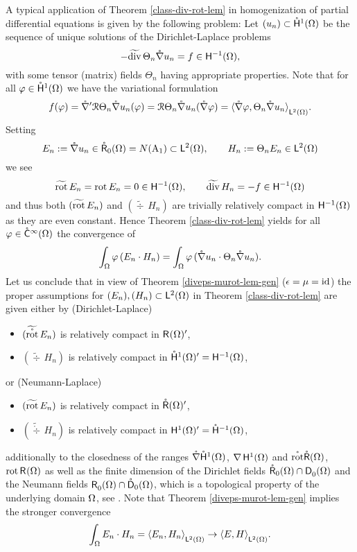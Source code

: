\documentclass[a4paper]{amsart}
\newcommand{\hmoc}{\mathring\hsymbol^{-1}}
\newcommand{\hmocom}{\hmoc(\om)}
\renewcommand{\dc}{\mathring\dsymbol}
\renewcommand{\R}{\mathcal{R}}
\DeclareMathOperator{\Ao}{A_{1}}
\newcommand{\grad}{\na}
\newcommand{\gradc}{\mathring\grad}
\renewcommand{\rotc}{\mathring\rot}
\renewcommand{\divc}{\mathring\div}
\begin{document}
A typical application of Theorem \ref{class-div-rot-lem} 
in homogenization of partial differential equations is given by the following problem:
Let $(u_{n})\subset\mathring{\mathsf{H}}^{1}(\Omega)$ be the sequence of unique solutions of the Dirichlet-Laplace problems
$$-\widetilde{\div}\,\Theta_{n}\gradc u_{n}=f\in\hmoom,$$
with some tensor (matrix) fields $\Theta_{n}$ having appropriate properties.
Note that for all $\varphi\in\mathring{\mathsf{H}}^{1}(\Omega)$ we have the variational formulation
$$f(\varphi)
=\gradc{}'\R\Theta_{n}\gradc u_{n}(\varphi)
=\R\Theta_{n}\gradc u_{n}(\gradc\varphi)
=\scpltom{\gradc\varphi}{\Theta_{n}\gradc u_{n}}.$$
Setting
$$E_{n}:=\gradc u_{n}\in\rczom=N(\Ao)\subset\ltom,\qquad
H_{n}:=\Theta_{n}E_{n}\in\ltom$$
we see
$$\widetilde{\operatorname{rot}}\,E_{n}=\operatorname{rot} E_{n}=0\in\overset{}{\mathsf{H}}{}^{-1}_{}(\Omega),\qquad
\widetilde{\operatorname{div}}\,H_{n}=-f\in\overset{}{\mathsf{H}}{}^{-1}_{}(\Omega)$$
and thus both $(\widetilde{\operatorname{rot}}\,E_{n})$ and $(\widetilde{\div}\,H_{n})$ 
are trivially relatively compact in $\overset{}{\mathsf{H}}{}^{-1}_{}(\Omega)$ as they are even constant.
Hence Theorem \ref{class-div-rot-lem} yields for all $\varphi\in\mathring{\mathsf{C}}^{\infty}(\Omega)$ the convergence of
$$\int_{\om}\varphi\,(E_{n}\cdot H_{n})
=\int_{\om}\varphi\,(\gradc u_{n}\cdot\Theta_{n}\gradc u_{n}).$$
Let us conclude that in view of Theorem \ref{diveps-murot-lem-gen} ($\epsilon=\mu=\operatorname{id}$)
the proper assumptions for $(E_{n}),(H_{n})\subset\overset{}{\mathsf{L}}{}^{2}_{}(\Omega)$ in Theorem \ref{class-div-rot-lem}
are given either by (Dirichlet-Laplace)
\begin{itemize}
\item
$(\widetilde{\rotc}\,E_{n})$ 
is relatively compact in $\overset{}{\mathsf{R}}{}^{}_{}(\Omega)'$,
\item
$(\widetilde{\div}\,H_{n})$ 
is relatively compact in $\mathring{\mathsf{H}}^{1}(\Omega)'=\overset{}{\mathsf{H}}{}^{-1}_{}(\Omega)$,
\end{itemize}
or (Neumann-Laplace)
\begin{itemize}
\item
$(\widetilde{\operatorname{rot}}\,E_{n})$ 
is relatively compact in $\mathring{\mathsf{R}}(\Omega)'$,
\item
$(\widetilde{\divc}\,H_{n})$ 
is relatively compact in $\hoom'=\hmocom$,
\end{itemize}
additionally to the closedness of
the ranges $\gradc\hocom$, $\grad\hoom$ and $\rotc\rcom$, $\operatorname{rot}\overset{}{\mathsf{R}}{}^{}_{}(\Omega)$ 
as well as the finite dimension of the Dirichlet fields $\mathring{\mathsf{R}}_{0}(\Omega)\cap\overset{}{\mathsf{D}}{}^{}_{0}(\Omega)$
and the Neumann fields $\rzom\cap\dc_{0}(\om)$,
which is a topological property of the underlying domain $\Omega$,
see \cite{picardharmdiff,picardpotential,picardboundaryelectro}.
Note that Theorem \ref{diveps-murot-lem-gen} implies the stronger convergence
$$\int_{\Omega}E_{n}\cdot H_{n}
=\langle E_{n},H_{n}\rangle_{\overset{}{\mathsf{L}}{}^{2}_{}(\Omega)}
\to\langle E,H\rangle_{\overset{}{\mathsf{L}}{}^{2}_{}(\Omega)}.$$
\end{document}
